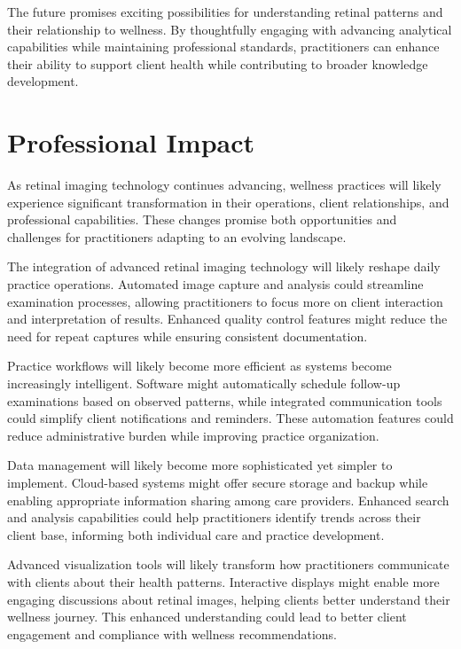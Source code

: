 \documentclass[
  Letterpaper,
]{scrbook}
\begin{document}
The future promises exciting possibilities for understanding retinal
patterns and their relationship to wellness. By thoughtfully engaging
with advancing analytical capabilities while maintaining professional
standards, practitioners can enhance their ability to support client
health while contributing to broader knowledge development.

\section{Professional Impact}\label{professional-impact}

As retinal imaging technology continues advancing, wellness practices
will likely experience significant transformation in their operations,
client relationships, and professional capabilities. These changes
promise both opportunities and challenges for practitioners adapting to
an evolving landscape.

The integration of advanced retinal imaging technology will likely
reshape daily practice operations. Automated image capture and analysis
could streamline examination processes, allowing practitioners to focus
more on client interaction and interpretation of results. Enhanced
quality control features might reduce the need for repeat captures while
ensuring consistent documentation.

Practice workflows will likely become more efficient as systems become
increasingly intelligent. Software might automatically schedule
follow-up examinations based on observed patterns, while integrated
communication tools could simplify client notifications and reminders.
These automation features could reduce administrative burden while
improving practice organization.

Data management will likely become more sophisticated yet simpler to
implement. Cloud-based systems might offer secure storage and backup
while enabling appropriate information sharing among care providers.
Enhanced search and analysis capabilities could help practitioners
identify trends across their client base, informing both individual care
and practice development.

Advanced visualization tools will likely transform how practitioners
communicate with clients about their health patterns. Interactive
displays might enable more engaging discussions about retinal images,
helping clients better understand their wellness journey. This enhanced
understanding could lead to better client engagement and compliance with
wellness recommendations.
\end{document}

